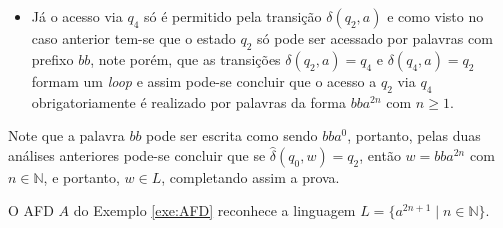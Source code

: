 \begin{prova}
\begin{itemize}
    \item Já o acesso via $q_4$ só é permitido pela transição $\delta(q_2, a)$ e como visto no caso anterior tem-se que o estado $q_2$ só pode ser acessado por palavras com prefixo $bb$, note porém, que as transições $\delta(q_2, a) = q_4$ e $\delta(q_4, a) = q_2$ formam um \textit{loop} e assim pode-se concluir que o acesso a $q_2$ via $q_4$ obrigatoriamente é realizado por palavras da forma $bba^{2n}$ com $n \geq 1$.
  \end{itemize}
  Note que a palavra $bb$ pode ser escrita como sendo $bba^0$, portanto, pelas duas análises anteriores pode-se concluir que se $\widehat{\delta}(q_0, w) = q_2$, então $w = bba^{2n}$ com $n \in \mathbb{N}$, e portanto, $w \in L$, completando assim a prova. 
\end{prova}

\begin{exemplo}
	O AFD $A$ do Exemplo \ref{exe:AFD} reconhece a linguagem $L = \{a^{2n + 1} \mid n \in \mathbb{N}\}$.
\end{exemplo}

